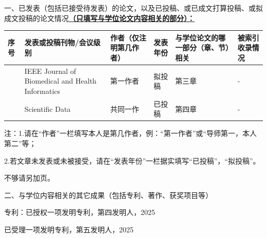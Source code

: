 
一、已发表（包括已接受待发表）的论文，以及已投稿、或已成文打算投稿、或拟成文投稿的论文情况\textbf{\underline{（只填写与学位论文内容相关的部分）：}}

\begin{longtable}{|>{\centering}m{0.5cm}|>{\centering}m{3.5cm}|>{\centering}m{2.3cm}|>{\centering}m{2cm}|>{\centering}m{2.6cm}|>{\centering}m{2cm}|}
\hline 
\textbf{序号} & \textbf{发表或投稿刊物/会议级别} & \textbf{作者（仅注明第几作者）}  & \textbf{发表年份} & \textbf{与学位论文的哪一部分（章、节）相关} & \textbf{被索引收录情况}\tabularnewline
\hline 
1 & IEEE Journal of Biomedical and Health Informatics & 第一作者 & 拟投稿  & 第三章 & - \tabularnewline
\hline 
2 & Scientific Data & 共同一作 &  已投稿 & 第四章 & - \tabularnewline
\hline
\end{longtable}

\noindent 注：1.请在“作者”一栏填写本人是第几作者，例：“第一作者”或“导师第一，本人第二”等；

\noindent\quad\quad2.若文章未发表或未被接受，请在“发表年份”一栏据实填写“已投稿”，“拟投稿”。

\noindent\quad\quad 不够请另加页。

二、与学位内容相关的其它成果（包括专利、著作、获奖项目等）

专利：已授权一项发明专利，第四发明人，2025

\quad\quad 已受理一项发明专利，第五发明人，2025
